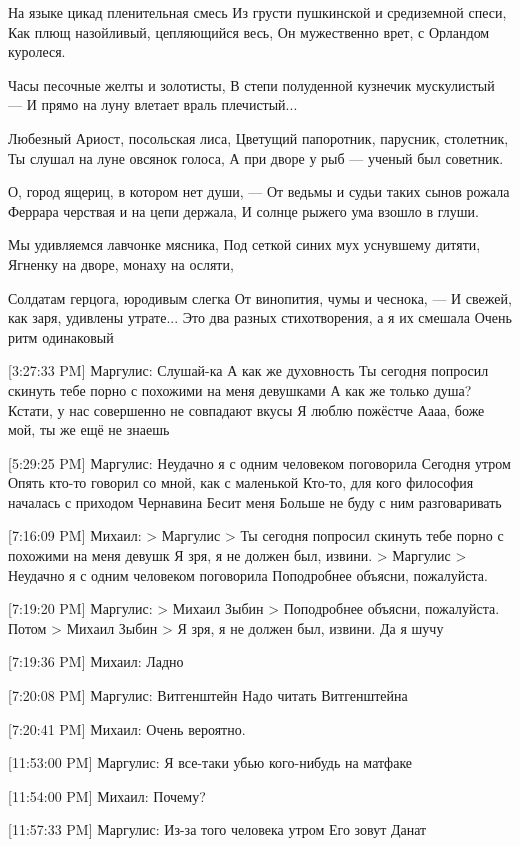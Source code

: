 \documentclass{article}
\begin{document}
{На языке цикад пленительная смесь
Из грусти пушкинской и средиземной спеси,
Как плющ назойливый, цепляющийся весь,
Он мужественно врет, с Орландом куролеся.

Часы песочные желты и золотисты,
В степи полуденной кузнечик мускулистый — 
И прямо на луну влетает враль плечистый...

Любезный Ариост, посольская лиса,
Цветущий папоротник, парусник, столетник,
Ты слушал на луне овсянок голоса,
А при дворе у рыб — ученый был советник.

О, город ящериц, в котором нет души, — 
От ведьмы и судьи таких сынов рожала
Феррара черствая и на цепи держала,
И солнце рыжего ума взошло в глуши.

Мы удивляемся лавчонке мясника,
Под сеткой синих мух уснувшему дитяти,
Ягненку на дворе, монаху на осляти,

Солдатам герцога, юродивым слегка
От винопития, чумы и чеснока, — 
И свежей, как заря, удивлены утрате...
 Это два разных стихотворения, а я их смешала
 Очень ритм одинаковый

[3:27:33 PM] Маргулис:
Слушай-ка
 А как же духовность
 Ты сегодня попросил скинуть тебе порно с похожими на меня девушками
 А как же только душа?
 Кстати, у нас совершенно не совпадают вкусы
 Я люблю пожёстче
 Аааа, боже мой, ты же ещё не знаешь

[5:29:25 PM] Маргулис:
Неудачно я с одним человеком поговорила
 Сегодня утром
 Опять кто-то говорил со мной, как с маленькой
 Кто-то, для кого философия началась с приходом Чернавина
 Бесит меня
 Больше не буду с ним разговаривать

[7:16:09 PM] Михаил:
> Маргулис
> Ты сегодня попросил скинуть тебе порно с похожими на меня девушк
Я зря, я не должен был, извини.
> Маргулис
> Неудачно я с одним человеком поговорила
Поподробнее объясни, пожалуйста.

[7:19:20 PM] Маргулис:
> Михаил Зыбин
> Поподробнее объясни, пожалуйста.
Потом
> Михаил Зыбин
> Я зря, я не должен был, извини.
Да я шучу

[7:19:36 PM] Михаил:
Ладно

[7:20:08 PM] Маргулис:
Витгенштейн
 Надо читать Витгенштейна

[7:20:41 PM] Михаил:
Очень вероятно.

[11:53:00 PM] Маргулис:
Я все-таки убью кого-нибудь на матфаке

[11:54:00 PM] Михаил:
Почему?

[11:57:33 PM] Маргулис:
Из-за того человека утром
 Его зовут Данат

}
\end{document}
